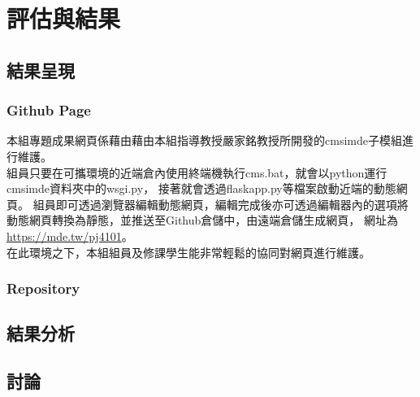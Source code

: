 \chapter{評估與結果}

\section{結果呈現}
\subsection{Github Page}
本組專題成果網頁係藉由藉由本組指導教授嚴家銘教授所開發的cmsimde子模組進行維護。\\

組員只要在可攜環境的近端倉內使用終端機執行cms.bat，就會以python運行cmsimde資料夾中的wsgi.py，
接著就會透過flaskapp.py等檔案啟動近端的動態網頁。
組員即可透過瀏覽器編輯動態網頁，編輯完成後亦可透過編輯器內的選項將動態網頁轉換為靜態，並推送至Github倉儲中，由遠端倉儲生成網頁，
網址為\url{https://mde.tw/pj4101}。\\

在此環境之下，本組組員及修課學生能非常輕鬆的協同對網頁進行維護。

\subsection{Repository}
\subsection{}
\subsection{}

\section{結果分析}
\subsection{}
\subsection{}
\subsection{}

\section{討論}
\subsection{}
\subsection{}
\subsection{}